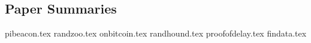 \subsection{Paper Summaries}\label{sec:papersummaries}

\begin{description}
    {pibeacon.tex}
    {randzoo.tex}
    {onbitcoin.tex}
    {randhound.tex}
    {proofofdelay.tex}
    {findata.tex}
\end{description}
 
 